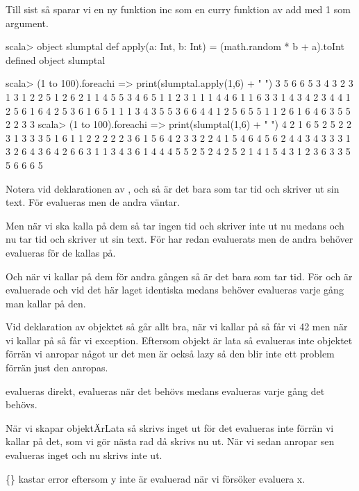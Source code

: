 Till sist så sparar vi en ny funktion inc som en curry funktion av add med 1 som argument.

\Subtask
\begin{REPL}
scala> object slumptal{ def apply(a: Int, b: Int) = (math.random * b + a).toInt }
defined object slumptal

scala> (1 to 100).foreach{i => print(slumptal.apply(1,6) + " ")}
3 5 6 6 5 3 4 3 2 3 1 3 1 2 2 5 1 2 6 2 1 1 4 5 5 3 4 6 5 1 1 2 3 1 1 1 4 4 6 1 1 6 3 3 1 4 3 4 2 3 4 4 1 2 5 6 1 6 4 2 5 3 6 1 6 5 1 1 1 3 4 3 5 5 3 6 6 4 4 1 2 5 6 5 5 1 1 2 6 1 6 4 6 3 5 5 2 2 3 3 
scala> (1 to 100).foreach{i => print(slumptal(1,6) + " ")}
4 2 1 6 5 2 5 2 2 3 1 3 3 3 5 1 6 1 1 2 2 2 2 2 3 6 1 5 6 4 2 3 3 2 2 4 1 5 4 6 4 5 6 2 4 4 3 4 3 3 3 1 3 2 6 4 3 6 4 2 6 6 3 1 1 3 4 3 6 1 4 4 4 5 5 2 5 2 4 2 5 2 1 4 1 5 4 3 1 2 3 6 3 3 5 5 6 6 6 5 

\end{REPL}

\Task

\Subtask Notera vid deklarationen av ,  och  så är det bara  som tar tid och skriver ut sin text. För  evalueras men de andra väntar.

Men när vi ska kalla på dem så tar  ingen tid och skriver inte ut nu medans  och  nu tar tid och skriver ut sin text. För  har redan evaluerats men de andra behöver evalueras för de kallas på.  

Och när vi kallar på dem för andra gången så är det bara  som tar tid. För  och  är evaluerade och vid det här laget identiska medans  behöver evalueras varje gång man kallar på den.

Vid deklaration av objektet så går allt bra, när vi kallar på  så får vi 42 men när vi kallar på  så får vi exception. Eftersom objekt är lata så evalueras inte objektet förrän vi anropar något ur det men  är också lazy så den blir inte ett problem förrän just den anropas.

\Subtask
{} evalueras direkt,  evalueras när det behövs medans  evalueras varje gång det behövs.

\Subtask
När vi skapar objektÄrLata så skrivs inget ut för det evalueras inte förrän vi kallar på det, som vi gör nästa rad då skrivs nu ut. När vi sedan anropar sen evalueras inget och nu skrivs inte ut.

\{\} kastar error eftersom y inte är evaluerad när vi försöker evaluera x.


